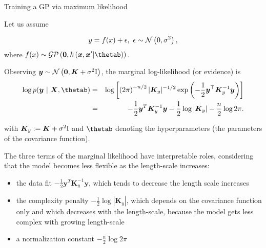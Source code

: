 \begin{vbframe}{Training a GP via maximum likelihood}

Let us assume 

$$
	y = f(x) + \epsilon, ~ \epsilon \sim \mathcal{N}\left(0, \sigma^2\right),
$$
where $\fx \sim \mathcal{GP}\left(\bm{0}, k\left(\xv, \xv^\prime | \thetab \right)\right)$. 

\lz 

Observing $\bm{y} \sim \mathcal{N}\left(\bm{0}, \bm{K} + \sigma^2 \mathrm{I}\right)$, the marginal log-likelihood (or evidence) is
\begin{eqnarray*}
\log p(\bm{y} ~|~ \bm{X}, \thetab) &=& \log \left[\left(2 \pi\right)^{-n / 2} |\bm{K}_y|^{-1 / 2} \exp\left(- \frac{1}{2} \bm{y}^\top \bm{K}_y^{-1} \bm{y}\right) \right]\\
&=& -\frac{1}{2}\bm{y}^T\bm{K}_y^{-1} \bm{y} - \frac{1}{2} \log \left| \bm{K}_y \right| - \frac{n}{2} \log 2\pi. 
\end{eqnarray*}

with $\bm{K}_y:=\bm{K} + \sigma^2 \mathrm{I}$ and $\thetab$ denoting the hyperparameters (the parameters of the covariance function). 

\framebreak


The three terms of the marginal likelihood have interpretable roles, considering that 
the model becomes less flexible as the length-scale increases:

\begin{itemize}
\item the data fit $-\frac{1}{2}\bm{y}^T\bm{K}_y^{-1} \bm{y}$, which tends to decrease the length scale increases
\item the complexity penalty $- \frac{1}{2} \log \left| \bm{K}_y \right|$, which depends on the covariance function only and which decreases with the length-scale, because the model gets less complex with growing length-scale
\item a normalization constant $- \frac{n}{2} \log 2\pi$
\end{itemize}

\end{vbframe}

